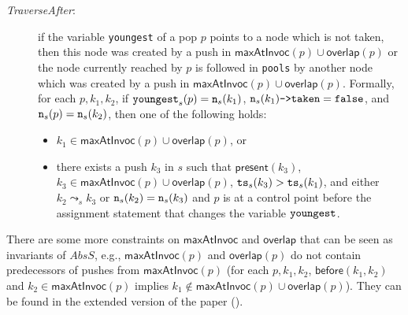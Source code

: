 \begin{description}
	\item[\emph{TraverseAfter}:] if the variable {\tt youngest} of a pop $p$ points to a node which is not taken, then this node was created by a push in $\mathsf{maxAtInvoc}(p)\cup \mathsf{overlap}(p)$ or the node currently reached by $p$ is followed in {\tt pools} by another node which was created by a push in $\mathsf{maxAtInvoc}(p)\cup \mathsf{overlap}(p)$. Formally,  for each $p, k_1,k_2$, if ${\tt youngest}_s(p)={\tt n}_s(k_1)$, ${\tt n}_s(k_1)\text{{\tt ->taken}}={\tt false}$, and ${\tt n}_s(p)={\tt n}_s(k_2)$, then one of the following holds:
	\begin{itemize}
		\item $k_1\in \mathsf{maxAtInvoc}(p)\cup \mathsf{overlap}(p)$, or 
		\item there exists a push $k_3$ in $s$ such that $\mathsf{present}(k_3)$, $k_3\in \mathsf{maxAtInvoc}(p)\cup \mathsf{overlap}(p)$, ${\tt ts}_s(k_3) > {\tt ts}_s(k_1)$, and either $k_2\leadsto_s k_3$ or ${\tt n}_s(k_2)={\tt n}_s(k_3)$ and $p$ is at a control point before the assignment statement that changes the variable ${\tt youngest}$.
	\end{itemize}
%	

\vspace{-2mm}
\end{description}
There are some more constraints on $\mathsf{maxAtInvoc}$ and $\mathsf{overlap}$ that can be seen as invariants of $AbsS$, e.g., $\mathsf{maxAtInvoc}(p)$ and $\mathsf{overlap}(p)$ do not contain predecessors of pushes from $\mathsf{maxAtInvoc}(p)$ (for each $p, k_1, k_2$, $\mathsf{before}(k_1, k_2)$ and $k_2 \in \mathsf{maxAtInvoc}(p)$ implies $k_1\not\in \mathsf{maxAtInvoc}(p)\cup \mathsf{overlap}(p)$). They can be found in the extended version of the paper (\cite{extended}).

